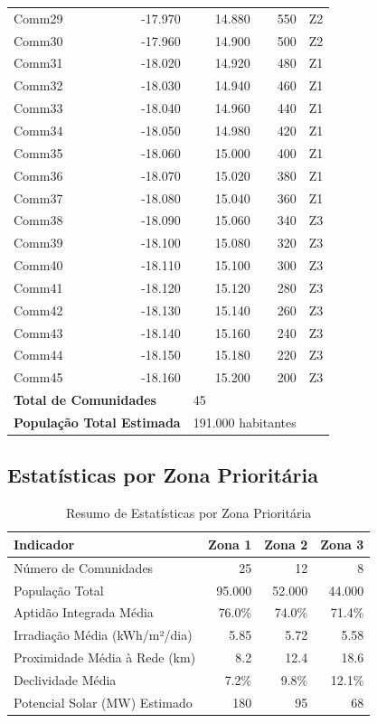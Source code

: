 \documentclass[12pt, a4paper]{article}
\begin{document}
\begin{table}[H]
\begin{tabular}{|l|r|r|r|r|}
Comm29 & -17.970 & 14.880 & 550 & Z2 \\
Comm30 & -17.960 & 14.900 & 500 & Z2 \\
Comm31 & -18.020 & 14.920 & 480 & Z1 \\
Comm32 & -18.030 & 14.940 & 460 & Z1 \\
Comm33 & -18.040 & 14.960 & 440 & Z1 \\
Comm34 & -18.050 & 14.980 & 420 & Z1 \\
Comm35 & -18.060 & 15.000 & 400 & Z1 \\
Comm36 & -18.070 & 15.020 & 380 & Z1 \\
Comm37 & -18.080 & 15.040 & 360 & Z1 \\
Comm38 & -18.090 & 15.060 & 340 & Z3 \\
Comm39 & -18.100 & 15.080 & 320 & Z3 \\
Comm40 & -18.110 & 15.100 & 300 & Z3 \\
Comm41 & -18.120 & 15.120 & 280 & Z3 \\
Comm42 & -18.130 & 15.140 & 260 & Z3 \\
Comm43 & -18.140 & 15.160 & 240 & Z3 \\
Comm44 & -18.150 & 15.180 & 220 & Z3 \\
Comm45 & -18.160 & 15.200 & 200 & Z3 \\
\hline
\multicolumn{2}{|l|}{\textbf{Total de Comunidades}} & \multicolumn{2}{l|}{45} & \\
\multicolumn{2}{|l|}{\textbf{População Total Estimada}} & \multicolumn{2}{l|}{191.000 habitantes} & \\
\hline
\end{tabular}
\end{table}

\subsection{Estatísticas por Zona Prioritária}

\begin{table}[H]
\centering
\caption{Resumo de Estatísticas por Zona Prioritária}
\label{Tab:12}
\begin{tabular}{|l|r|r|r|}
\hline
\textbf{Indicador} & \textbf{Zona 1} & \textbf{Zona 2} & \textbf{Zona 3} \\
\hline
Número de Comunidades & 25 & 12 & 8 \\
População Total & 95.000 & 52.000 & 44.000 \\
Aptidão Integrada Média & 76.0\% & 74.0\% & 71.4\% \\
Irradiação Média (kWh/m²/dia) & 5.85 & 5.72 & 5.58 \\
Proximidade Média à Rede (km) & 8.2 & 12.4 & 18.6 \\
Declividade Média & 7.2\% & 9.8\% & 12.1\% \\
Potencial Solar (MW) Estimado & 180 & 95 & 68 \\
\hline
\end{tabular}
\end{table}
\end{document}

